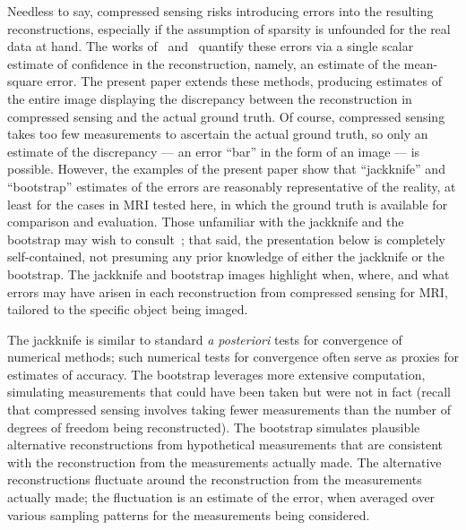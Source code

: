\documentclass[article]{jdssv}
\begin{document}
Needless to say, compressed sensing risks introducing errors
into the resulting reconstructions, especially if the assumption of sparsity
is unfounded for the real data at hand. The works
of~\citet{malioutov-sanghavi-willsky} and~\citet{ward}
quantify these errors via a single scalar estimate of confidence
in the reconstruction, namely, an estimate of the mean-square error.
The present paper extends these methods, producing estimates
of the entire image displaying the discrepancy between the reconstruction
in compressed sensing and the actual ground truth.
Of course, compressed sensing takes too few measurements to ascertain
the actual ground truth, so only an estimate of the discrepancy
--- an error ``bar'' in the form of an image --- is possible.
However, the examples of the present paper show that ``jackknife''
and ``bootstrap'' estimates of the errors are reasonably representative
of the reality, at least for the cases in MRI tested here,
in which the ground truth is available for comparison and evaluation.
Those unfamiliar with the jackknife and the bootstrap may wish
to consult~\citet{efron-tibshirani};
that said, the presentation below is completely self-contained,
not presuming any prior knowledge of either the jackknife or the bootstrap.
The jackknife and bootstrap images highlight when, where, and what errors
may have arisen in each reconstruction from compressed sensing for MRI,
tailored to the specific object being imaged.

The jackknife is similar to standard {\it a posteriori} tests for convergence
of numerical methods; such numerical tests for convergence
often serve as proxies for estimates of accuracy.
The bootstrap leverages more extensive computation, simulating measurements
that could have been taken but were not in fact
(recall that compressed sensing involves taking fewer measurements
than the number of degrees of freedom being reconstructed).
The bootstrap simulates plausible alternative reconstructions
from hypothetical measurements that are consistent
with the reconstruction from the measurements actually made.
The alternative reconstructions fluctuate around the reconstruction
from the measurements actually made;
the fluctuation is an estimate of the error,
when averaged over various sampling patterns
for the measurements being considered.
\end{document}
